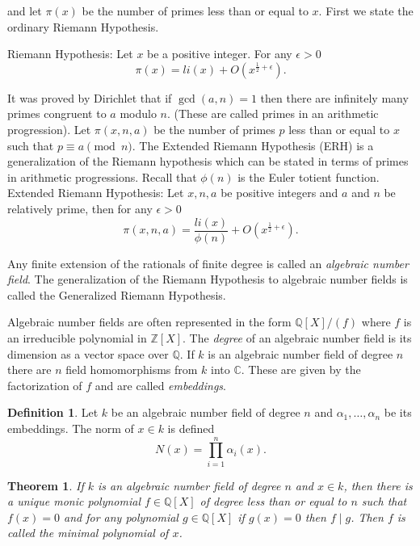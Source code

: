 \documentclass{article}
\newcounter{dummy} \numberwithin{dummy}{section}
\theoremstyle{plain}
\newtheorem{thm}[dummy]{Theorem}
\theoremstyle{definition}
\newtheorem{mydef}[dummy]{Definition}
\begin{document}
				\noindent and let $\pi(x)$ be the number of primes less than or equal to $x$. First we state the ordinary Riemann Hypothesis.

				Riemann Hypothesis: Let $x$ be a positive integer. For any $\epsilon>0$ 
				\[\pi(x) = li(x)+O(x^{\frac {1}{2}+\epsilon}). \]

				It was proved by Dirichlet that if $\gcd(a,n)=1$ then there are infinitely many primes congruent to $a$ modulo $n$. (These are called primes in an arithmetic progression). Let $\pi(x,n,a)$ be the number of primes $p$ less than or equal to $x$ such that $p \equiv a \pmod n$. The Extended Riemann Hypothesis (ERH) is a generalization of the Riemann hypothesis which can be stated in terms of primes in arithmetic progressions. Recall that $\phi(n)$ is the Euler totient function. 
        Extended Riemann Hypothesis: Let $x,n,a$ be positive integers and $a$ and $n$ be relatively prime, then for any $\epsilon>0$ 
				\[\pi(x,n,a) = \frac {li(x)}{\phi(n)}+O(x^{\frac {1}{2}+\epsilon}). \]

				Any finite extension of the rationals of finite degree is called an \emph{algebraic number field}. The generalization of the Riemann Hypothesis to algebraic number fields is called the Generalized Riemann Hypothesis. 

				Algebraic number fields are often represented in the form $\mathbb{Q}[X]/(f)$ where $f$ is an irreducible polynomial in $\mathbb{Z}[X]$. The \emph{degree} of an algebraic number field is its dimension as a vector space over $\mathbb{Q}$. If $k$ is an algebraic number field of degree $n$ there are $n$ field homomorphisms from $k$ into $\mathbb{C}$. These are given by the factorization of $f$ and are called \emph{embeddings}. 

				\begin{mydef}
				\label{DEF:NORM}
				    Let $k$ be an algebraic number field of degree $n$ and $\alpha_1,\ldots, \alpha_n$ be its embeddings. The norm of $x \in k$ is defined 
				    \[N(x)=\prod_{i=1}^n{\alpha_i(x)}.\]
				\end{mydef}

				\begin{thm}
				\label{THM:minpol}
				    If $k$ is an algebraic number field of degree $n$ and $x \in k$, then there is a unique monic polynomial $f \in \mathbb{Q}[X]$ of degree less than or equal to $n$ such that $f(x)=0$ and for any polynomial $g \in \mathbb{Q}[X]$ if $g(x)=0$ then $f \mid g$. Then $f$ is called the \emph{minimal polynomial} of $x$. 
				\end{thm}
				
\end{document}
